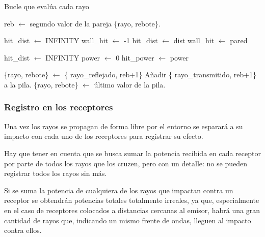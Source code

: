 \begin{algorithm}
    \caption{Bucle que evalúa cada rayo}
    \label{alg:ray}
    \begin{algorithmic}[1]
        
            \State reb $\gets$ segundo valor de la pareja \{rayo, rebote\}.

                \State hit\_dist $\gets$ INFINITY
                \State wall\_hit $\gets$ -1
                        \State hit\_dist $\gets$ dist
                        \State wall\_hit $\gets$ pared
                    \EndIf
                \EndIf
            \EndFor

                \State hit\_dist $\gets$ INFINITY
                \State power $\gets$ 0
                        \State hit\_power $\gets$ power
                    \EndIf
                \EndIf
            \EndFor

                \State \{rayo, rebote\} $\gets$ \{ rayo\_reflejado, reb+1\}
                \State Añadir \{ rayo\_transmitido, reb+1\} a la pila.
            \Else
                \State \{rayo, rebote\} $\gets$ último valor de la pila.
            \EndIf
        \EndWhile
    \end{algorithmic}
\end{algorithm}

\subsubsection*{Registro en los receptores}

Una vez los rayos se propagan de forma libre por el entorno se esparará a su impacto con cada uno de los receptores para registrar su efecto.

Hay que tener en cuenta que se busca sumar la potencia recibida en cada receptor por parte de todos los rayos que los cruzen, pero con un detalle: no se pueden registrar todos los rayos sin más.

Si se suma la potencia de cualquiera de los rayos que impactan contra un receptor se obtendrán potencias totales totalmente irreales, ya que, especialmente en el caso de receptores colocados a distancias cercanas al emisor, habrá una gran cantidad de rayos que, indicando un mismo frente de ondas, lleguen al impacto contra ellos.

